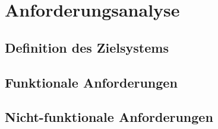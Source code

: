 
\newpage

\chapter{Anforderungsanalyse} %
\label{cha:anforderungsanalyse}


\section{ Definition des Zielsystems}
\label{sec:definition_des_zielsystems}


\section{Funktionale Anforderungen}
\label{sec:funktionale_anforderungen}


\section{Nicht-funktionale Anforderungen}
\label{sec:nicht-funktionale_anforderungen}